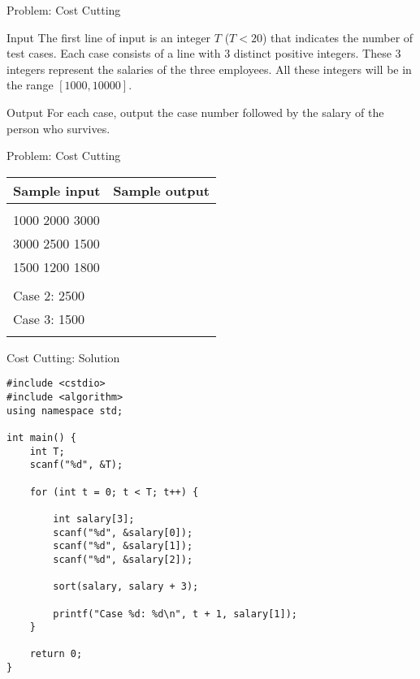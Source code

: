 \documentclass[10pt]{beamer}
\begin{document}
\begin{frame}{Problem: Cost Cutting}
    \begin{block}{Input}
    {\small
       The first line of input is an integer $T$ ($T<20$) that indicates the number of test cases. Each case consists of a line with 3 distinct positive integers. These 3 integers represent the salaries of the three employees. All these integers will be in the range $[1000, 10000]$.
    }
    \end{block}

    \vspace{20pt}
    \begin{block}{Output}
    {\small
    For each case, output the case number followed by the salary of the person who survives.
    }
    \end{block}
\end{frame}

\begin{frame}{Problem: Cost Cutting}
    \begin{center}
        \begin{tabular}{|l|l|}
            \hline
            {\footnotesize Sample input} & {\footnotesize Sample output} \\
            \hline
            \begin{minipage}{100pt}
\vspace{10pt}
\ttfamily
3\\
1000 2000 3000\\
3000 2500 1500\\
1500 1200 1800\\
            \end{minipage}
&
\begin{minipage}{100pt}
\vspace{10pt}
\ttfamily
Case 1: 2000\\
Case 2: 2500\\
Case 3: 1500\\
\end{minipage}
\\
            \hline
        \end{tabular}
    \end{center}
\end{frame}


\begin{frame}[fragile]{Cost Cutting: Solution}
    \begin{verbatim}
#include <cstdio>
#include <algorithm>
using namespace std;

int main() {
    int T;
    scanf("%d", &T);

    for (int t = 0; t < T; t++) {

        int salary[3];
        scanf("%d", &salary[0]);
        scanf("%d", &salary[1]);
        scanf("%d", &salary[2]);

        sort(salary, salary + 3);

        printf("Case %d: %d\n", t + 1, salary[1]);
    }

    return 0;
}
\end{verbatim}
\end{frame}
\end{document}
